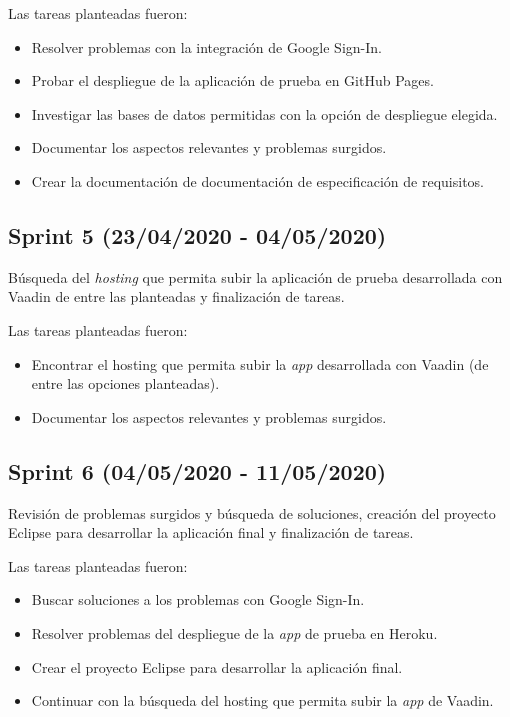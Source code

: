 Las tareas planteadas fueron:
\begin{itemize}
\tightlist
    \item Resolver problemas con la integración de Google Sign-In.
    \item Probar el despliegue de la aplicación de prueba en GitHub Pages.
    \item Investigar las bases de datos permitidas con la opción de despliegue elegida.
    \item Documentar los aspectos relevantes y problemas surgidos.
    \item Crear la documentación de documentación de especificación de requisitos.
\end{itemize}

\subsection{Sprint 5 (23/04/2020 - 04/05/2020)}
Búsqueda del \textit{hosting} que permita subir la aplicación de prueba desarrollada con Vaadin de entre las planteadas y finalización de tareas.

Las tareas planteadas fueron:
\begin{itemize}
\tightlist
    \item Encontrar el hosting que permita subir la \textit{app} desarrollada con Vaadin (de entre las opciones planteadas).
    \item Documentar los aspectos relevantes y problemas surgidos.
\end{itemize}

\subsection{Sprint 6 (04/05/2020 - 11/05/2020)}
Revisión de problemas surgidos y búsqueda de soluciones, creación del proyecto Eclipse para desarrollar la aplicación final y finalización de tareas.

Las tareas planteadas fueron:
\begin{itemize}
\tightlist
    \item Buscar soluciones a los problemas con Google Sign-In.
    \item Resolver problemas del despliegue de la \textit{app} de prueba en Heroku.
    \item Crear el proyecto Eclipse para desarrollar la aplicación final. 
    \item Continuar con la búsqueda del hosting que permita subir la \textit{app} de Vaadin.
\end{itemize}

